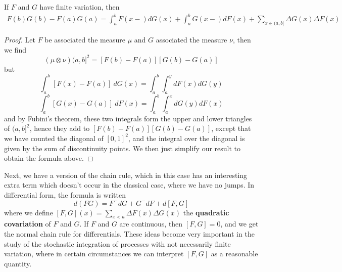 \begin{theorem}
    If $F$ and $G$ have finite variation, then
    \begin{align*}
        F(b)G(b) - F(a)G(a) = \int_a^b F(x-) dG(x) + \int_a^b G(x-) dF(x) + \sum_{x \in (a,b]} \Delta G(x) \Delta F(x)
    \end{align*}
\end{theorem}
\begin{proof}
    Let $F$ be associated the measure $\mu$ and $G$ associated the measure $\nu$, then we find
    \[ (\mu \otimes \nu)(a,b]^2 = [F(b) - F(a)][G(b) - G(a)] \]
    but
    \[ \int_{a}^b [F(x) - F(a)]\ dG(x) = \int_{a}^b \int_{a}^y dF(x) dG(y) \]
    \[ \int_{a}^b [G(x) - G(a)]\ dF(x) = \int_{a}^b \int_{a}^x dG(y) dF(x) \]
    and by Fubini's theorem, these two integrals form the upper and lower triangles of $(a,b]^2$, hence they add to $[F(b) - F(a)][G(b) - G(a)]$, except that we have counted the diagonal of $[0,1]^2$, and the integral over the diagonal is given by the sum of discontinuity points. We then just simplify our result to obtain the formula above.
\end{proof}

Next, we have a version of the chain rule, which in this case has an interesting extra term which doesn't occur in the classical case, where we have no jumps. In differential form, the formula is written
%
\[ d(FG) = F^-dG + G^-dF + d[F,G] \]
%
where we define $[F,G](x) = \sum_{x < a} \Delta F(x) \Delta G(x)$ the {\bf quadratic covariation} of $F$ and $G$. If $F$ and $G$ are continuous, then $[F,G] = 0$, and we get the normal chain rule for differentials. These ideas become very important in the study of the stochastic integration of processes with not necessarily finite variation, where in certain circumstances we can interpret $[F,G]$ as a reasonable quantity.

